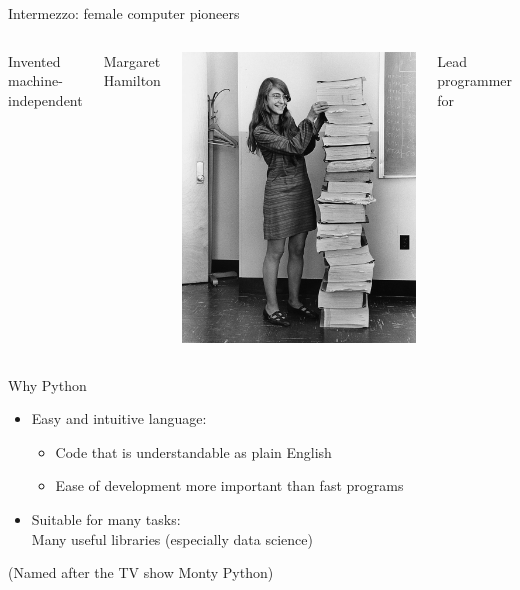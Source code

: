 \documentclass[aspectratio=169,usenames,dvipsnames]{beamer}
\begin{document}
\begin{frame}{Intermezzo: female computer pioneers}
\begin{columns}
		Invented machine-independent 

		\pause
		Margaret Hamilton %

		\vspace{1ex}
		\includegraphics[width=0.9\linewidth]{fig/margarethamilton}

		Lead programmer for 
	\end{columns}
\end{frame}

\begin{frame}{Why Python}
    \begin{itemize}
        \item Easy and intuitive language:
            \begin{itemize}
                \item Code that is understandable as plain English
                \item Ease of development more important than fast programs
            \end{itemize}
        \item Suitable for many tasks:\\
            Many useful libraries (especially data science)
    \end{itemize}

    (Named after the TV show Monty Python)
\end{frame}
\end{document}
